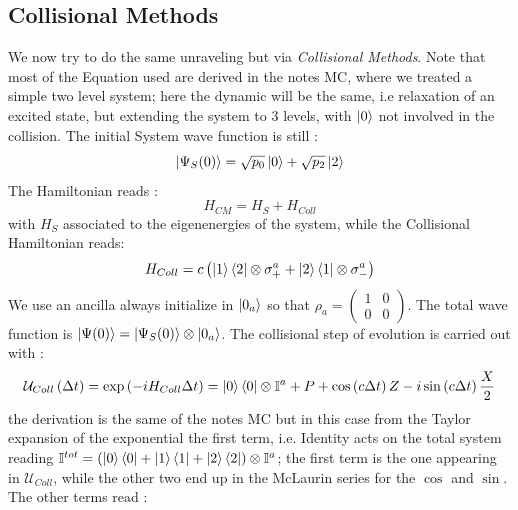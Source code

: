 \documentclass[a4paper,12pt]{article}
\begin{document}
	\newpage
	
	\subsection{Collisional Methods}
	We now try to do the same unraveling but via \textit{Collisional Methods}. Note that most of the Equation used are derived in the notes MC, where we treated a simple two level system; here the dynamic will be the same, i.e relaxation of an excited state, but extending the system to 3 levels, with $ \ket{0} $ not involved in the collision.
	The initial System wave function is still : 
	\begin{equation}
		\ket{\Psi_{S} (0)} = \sqrt{p_{0}} \ket{0} + \sqrt{p_{2}} \ket{2}
	\end{equation}
	The Hamiltonian reads : 
	\begin{equation}
		H_{CM} = H_{S} + H_{Coll}
	\end{equation}
	with $ H_{S} $ associated to the eigenenergies of the system, while the Collisional Hamiltonian reads:
	\begin{equation}
		H_{Coll} = c \left( \ket{1}\bra{2} \otimes \sigma_{+}^{a} + \ket{2}\bra{1} \otimes \sigma_{-}^{a} \right)
	\end{equation}
	We use an ancilla always initialize in $ \ket{0_{a}} $ so that $ \rho_{a} = \begin{pmatrix} 1 & 0 \\ 0 & 0 \end{pmatrix} $. \newline
	The total wave function is $ \ket{\Psi (0)} = \ket{\Psi_{S} (0)} \otimes \ket{0_{a}} $. \newline
	The collisional step of evolution is carried out with :
	\begin{equation}
		\mathcal{U}_{Coll} \left( \Delta t \right) = \exp \left( -i H_{Coll} \Delta t \right) = \ket{0}\bra{0} \otimes \mathbb{I}^{a} + P + \cos \left( c \Delta t \right) Z - i \sin \left( c \Delta t \right) \frac{X}{2} 
	\end{equation} 
	the derivation is the same of the notes MC but in this case from the Taylor expansion of the exponential the first term, i.e. Identity acts on the total system reading $ \mathbb{I}^{tot} = \left(\ket{0}\bra{0} + \ket{1}\bra{1} + \ket{2}\bra{2}\right) \otimes \mathbb{I}^{a} $; the first term is the one appearing in $ \mathcal{U}_{Coll} $, while the other two end up in the McLaurin series for the $ \cos $ and $ \sin $. \newline
	The other terms read : 
\end{document}
